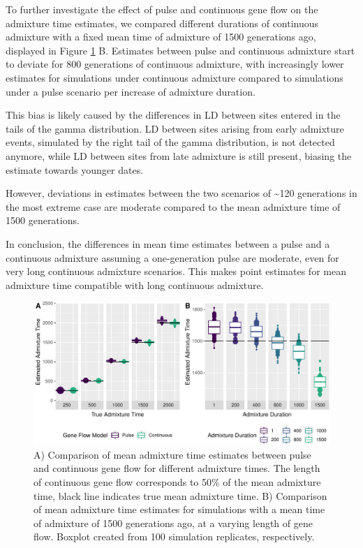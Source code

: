 \documentclass[]{article}
\begin{document}
To
further investigate the effect of pulse and continuous gene flow on the
admixture time estimates, we compared different durations of continuous
admixture with a fixed mean time of admixture of 1500
generations ago, displayed in Figure \ref{fig:fig2} B. Estimates between
pulse and continuous admixture start to deviate for 800 generations of
continuous admixture, with increasingly lower estimates for simulations
under continuous admixture compared to simulations under a pulse scenario per increase of admixture duration.

This bias is likely caused
by the differences in LD between sites entered in the tails of the gamma
distribution. LD between sites arising from early admixture events,
simulated by the right tail of the gamma distribution, is not detected
anymore, while LD between sites from late admixture is still present,
biasing the estimate towards younger dates. 

However, deviations in
estimates between the two scenarios of \textasciitilde{}120 generations
in the most extreme case are moderate compared to the mean admixture
time of 1500 generations.

In conclusion, the differences in mean time estimates between a pulse and a continuous admixture assuming a one-generation pulse are moderate, even for very long continuous admixture scenarios. This makes point estimates for mean admixture time compatible with long continuous admixture.


\begin{figure}
\centering
\includegraphics{Admixture_Time_Inference_Paper_Draft_files/figure-latex/fig2-1.pdf}
\caption{\label{fig:fig2} A) Comparison of mean admixture time estimates
between pulse and continuous gene flow for different admixture times.
The length of continuous gene flow corresponds to 50\% of the mean
admixture time, black line indicates true mean admixture time. B)
Comparison of mean admixture time estimates for simulations with a mean
time of admixture of 1500 generations ago, at a varying length of gene
flow. Boxplot created from 100 simulation replicates, respectively.}
\end{figure}
\end{document}
